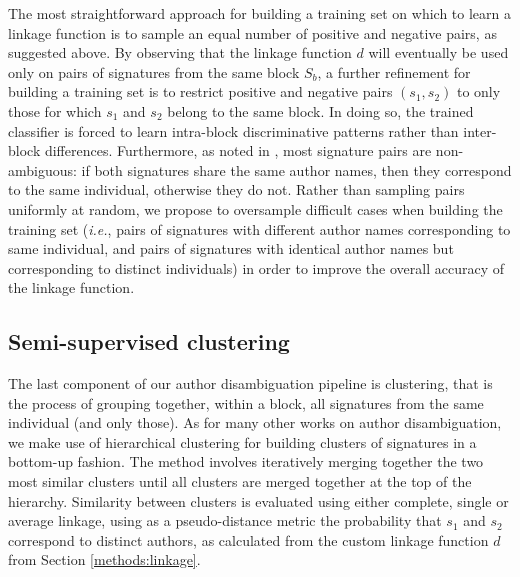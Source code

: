 \documentclass{article}
\newcommand{\ie}{\emph{i.e.}\xspace}
\begin{document}
The most straightforward approach for building a training set on which to learn
a linkage function is to sample an equal number of positive and negative pairs,
as suggested above.
By observing that the linkage function $d$ will eventually
be used only on pairs of signatures from the same block $S_b$, a further
refinement for building a training set is to restrict positive and negative
pairs $(s_1, s_2)$ to only those for which $s_1$ and $s_2$ belong to the same
block. In doing so, the trained classifier is forced to learn intra-block
discriminative patterns rather than inter-block differences.
Furthermore, as noted in \citep{lange2011frequency}, most signature pairs are non-ambiguous:
if both signatures share the same author names, then
they correspond to the same individual, otherwise they do not.
Rather than sampling pairs uniformly at random, we propose to oversample
difficult cases when building the training set (\ie, pairs of signatures with
different author names corresponding to same individual, and pairs of
signatures with identical author names but corresponding to distinct
individuals) in order to improve the overall accuracy of the linkage function.

\subsection{Semi-supervised clustering}
\label{methods:clustering}

The last component of our author disambiguation pipeline is clustering, that is
the process of grouping together, within a block, all signatures from the same
individual (and only those).
As for many other works on author disambiguation, we make use of hierarchical clustering \citep{ward1963hierarchical} for
building clusters of signatures in a bottom-up fashion.
The method involves iteratively merging together the two most similar clusters until all clusters
are merged together at the top of the hierarchy.
Similarity between clusters is evaluated using either complete, single or average linkage, using
as a pseudo-distance metric the probability that $s_1$ and $s_2$ correspond to
distinct authors, as calculated from the custom linkage function $d$ from Section \ref{methods:linkage}.
\end{document}

